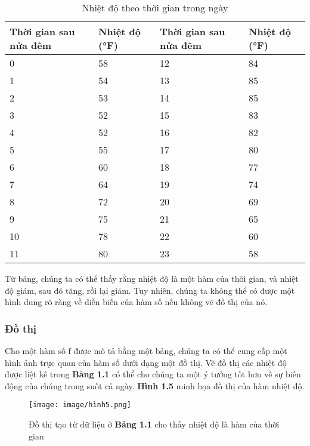 \documentclass[a4paper,12pt,openany]{book}
\begin{document}
\begin{table}[h!] 
\centering 
\small
\begin{tabularx}{\textwidth}{|X|X|X|X|} 
\hline 
\textbf{Thời gian sau nửa đêm} & \textbf{Nhiệt độ (°F)} & \textbf{Thời gian sau nửa đêm} & \textbf{Nhiệt độ (°F)} \\ \hline 
0 & 58 & 12 & 84 \\ \hline 1 & 54 & 13 & 85 \\ \hline 2 & 53 & 14 & 85 \\ \hline 3 & 52 & 15 & 83 \\ \hline 4 & 52 & 16 & 82 \\ \hline 5 & 55 & 17 & 80 \\ \hline 6 & 60 & 18 & 77 \\ \hline 7 & 64 & 19 & 74 \\ \hline 8 & 72 & 20 & 69 \\ \hline 9 & 75 & 21 & 65 \\ \hline 10 & 78 & 22 & 60 \\ \hline 11 & 80 & 23 & 58 \\ \hline \end{tabularx} \caption{Nhiệt độ theo thời gian trong ngày} \label{table:temperature} \end{table}

Từ bảng, chúng ta có thể thấy rằng nhiệt độ là một hàm của thời gian, và nhiệt độ giảm, sau đó tăng, rồi lại giảm. Tuy nhiên, chúng ta không thể có được một hình dung rõ ràng về diễn biến của hàm số nếu không vẽ đồ thị của nó.

\subsubsection{Đồ thị}

Cho một hàm số f được mô tả bằng một bảng, chúng ta có thể cung cấp một hình ảnh trực quan của hàm số dưới dạng một đồ thị. Vẽ đồ thị các nhiệt độ được liệt kê trong \textbf{Bảng 1.1} có thể cho chúng ta một ý tưởng tốt hơn về sự biến động của chúng trong suốt cả ngày. \textbf{Hình 1.5} minh họa đồ thị của hàm nhiệt độ.

\clearpage

\begin{figure}[H]
    \centering
    \texttt{[image: image/hình5.png]}
    \caption{Đồ thị tạo từ dữ liệu ở \textbf{Bảng 1.1} cho thấy nhiệt độ là hàm của thời gian}
    \label{fig:enter-label}
\end{figure}
\end{document}
